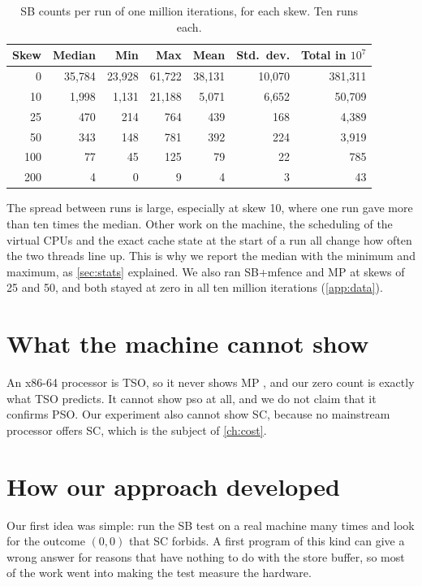 \begin{table}[!htbp]
\centering\small
\caption{SB  counts per run of one million iterations, for each skew. Ten runs each.}
\label{tab:skew}
\begin{tabular}{@{}rrrrrrr@{}}
\toprule
Skew & Median & Min & Max & Mean & Std.\ dev. & Total in $10^7$\\
\midrule
0 & 35{,}784 & 23{,}928 & 61{,}722 & 38{,}131 & 10{,}070 & 381{,}311\\
10 & 1{,}998 & 1{,}131 & 21{,}188 & 5{,}071 & 6{,}652 & 50{,}709\\
25 & 470 & 214 & 764 & 439 & 168 & 4{,}389\\
50 & 343 & 148 & 781 & 392 & 224 & 3{,}919\\
100 & 77 & 45 & 125 & 79 & 22 & 785\\
200 & 4 & 0 & 9 & 4 & 3 & 43\\
\bottomrule
\end{tabular}
\end{table}

The spread between runs is large, especially at skew 10, where one run gave more than ten times the median. Other work on the machine, the scheduling of the virtual CPUs and the exact cache state at the start of a run all change how often the two threads line up. This is why we report the median with the minimum and maximum, as \cref{sec:stats} explained. We also ran SB+mfence and MP at skews of 25 and 50, and both stayed at zero in all ten million iterations (\cref{app:data}).

\section{What the machine cannot show}

An x86-64 processor is TSO, so it never shows MP , and our zero count is exactly what TSO predicts. It cannot show \gls{pso} at all, and we do not claim that it confirms PSO. Our experiment also cannot show SC, because no mainstream processor offers SC, which is the subject of \cref{ch:cost}.

\section{How our approach developed}
\label{sec:q2history}

Our first idea was simple: run the SB test on a real machine many times and look for the outcome $(0,0)$ that SC forbids. A first program of this kind can give a wrong answer for reasons that have nothing to do with the store buffer, so most of the work went into making the test measure the hardware.

